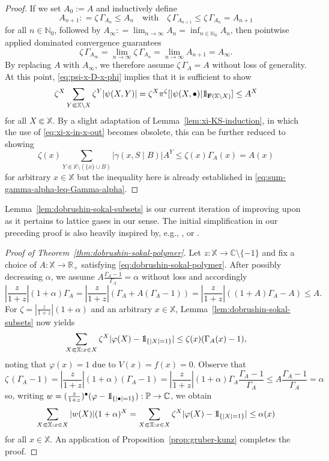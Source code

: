 \documentclass[reqno, 11pt]{amsart}
\theoremstyle{definition}
\newcommand{\N}{\mathbb{N}}
\newcommand{\R}{\mathbb{R}}
\newcommand{\C}{\mathbb{C}}
\renewcommand{\P}{\mathbb{P}}
\newcommand{\X}{\mathbb X}
\def\1{{\mathchoice {1\mskip-4mu\mathrm l}      
{1\mskip-4mu\mathrm l}
{1\mskip-4.5mu\mathrm l} {1\mskip-5mu\mathrm l}}}
\begin{document}
\begin{proof}
	If we set $A_0 := A$ and inductively define
	\[
		A_{n+1} : = \zeta \, \Gamma_{A_n} \leq A_n \quad \text{with} \quad \zeta \, \Gamma_{A_{n+1}} \leq \zeta \, \Gamma_{A_n} = A_{n+1}
	\]
	for all $n \in \N_0$, followed by $A_\infty : = \lim_{n\to\infty} A_n = \inf_{n \in \N_0} A_n$, then pointwise applied dominated convergence guarantees
	\[
		\zeta \, \Gamma_{A_\infty} = \lim_{n \to \infty} \zeta \, \Gamma_{A_n} = \lim_{n \to \infty} A_{n+1} = A_\infty.
	\]
	By replacing $A$ with $A_\infty$, we therefore assume $\zeta \, \Gamma_A = A$ without loss of generality. 
	At this point, \eqref{eq:psi-x-D-x-phi} implies that it is sufficient to show
	\[
		\zeta^X \sum_{Y \Subset \X \setminus X} \zeta^Y |\psi(X, Y)| = \zeta^X \pi^\zeta[|\psi(X, \bullet)| \1_{\mathbf F(\X \setminus X)}] \leq A^X
	\]
	for all $X \Subset \X$. 
	By a slight adaptation of Lemma~\ref{lem:xi-KS-induction}, in which the use of \eqref{eq:xi-x-in-x-out} becomes obsolete, this can be further reduced to showing
	\[
		\zeta(x) \sum_{Y \Subset \X \setminus (\{x\} \cup B)} |\gamma(x, S \mid B)| A^Y \leq \zeta(x) \Gamma_A(x) = A(x)
	\]
	for arbitrary $x \in \X$ but the inequality here is already established in \eqref{eq:sum-gamma-alpha-leq-Gamma-alpha}.
\end{proof}

Lemma~\ref{lem:dobrushin-sokal-subsets} is our current iteration of improving upon \cite[Theorem~2]{ref:procacci-scoppola} as it pertains to lattice gases in our sense. 
The initial simplification in our preceding proof is also heavily inspired by, e.g., \cite{ref:fernandez-procacci, ref:bissacot-fernandez-procacci}, \cite{ref:faris} or \cite{ref:jansen-hierarchical}.

\begin{proof}[Proof of Theorem~\ref{thm:dobrushin-sokal-polymer}]
	Let $z : \X \to \C \setminus \{-1\}$ and fix a choice of $A : \X \to \R_+$ satisfying \eqref{eq:dobrushin-sokal-polymer}. 
	After possibly decreasing $\alpha$, we assume $A\frac{\Gamma_A-1}{\Gamma_A} = \alpha$  without loss and accordingly
	\[
		|{\textstyle \frac{z}{1+z}}| (1+\alpha) \Gamma_A = |{\textstyle \frac{z}{1+z}}| (\Gamma_A + A (\Gamma_A-1)) = |{\textstyle \frac{z}{1+z}}| ((1+A) \Gamma_A - A) \leq A.
	\]
	For $\zeta = |\frac{z}{1+z}| (1 + \alpha)$ and an arbitrary $x \in \X$, Lemma~\ref{lem:dobrushin-sokal-subsets} now yields
	\[
		\sum_{X \Subset \X : x \in X} \zeta^X |\varphi(X) - \1_{\{|X|=1\}}| \leq \zeta(x) (\Gamma_A(x) - 1),
	\]
	noting that $\varphi(x) = 1$ due to $V(x) = f(x) = 0$. 
	Observe that
	\[
		\zeta \, (\Gamma_A - 1) = |{\textstyle \frac{z}{1+z}}| (1 + \alpha) (\Gamma_A - 1) = |{\textstyle \frac{z}{1+z}}| (1 + \alpha) \Gamma_A {\textstyle \frac{\Gamma_A - 1}{\Gamma_A}} \leq A {\textstyle \frac{\Gamma_A - 1}{\Gamma_A}} = \alpha
	\]
	so, writing $w = (\frac{z}{1+z})^\bullet (\varphi - \1_{\{|\bullet| = 1\}}) : \P \to \C$, we obtain
	\[
		\sum_{X \Subset \X : x \in X} |w(X)|(1+\alpha)^X = \sum_{X \Subset \X : x \in X} \zeta^X |\varphi(X) - \1_{\{|X|=1\}}| \leq \alpha(x)
	\]
	for all $x \in \X$. 
	An application of Proposition~\ref{prop:gruber-kunz} completes the proof.
\end{proof}
\end{document}
